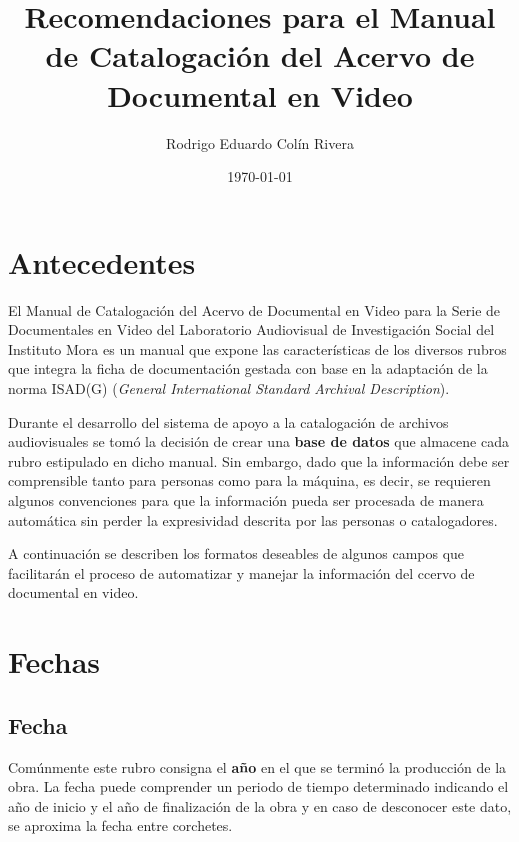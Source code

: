 \documentclass[10pt,letterpaper]{article}
\begin{document}
\title{Recomendaciones para el Manual de Catalogación del Acervo de Documental en Video}
\author{Rodrigo Eduardo Colín Rivera}
\date{\today}
\maketitle

\setcounter{secnumdepth}{0} %
\setcounter{tocdepth}{0} %

\section{Antecedentes}
El Manual de Catalogación del Acervo de Documental en Video para la Serie de Documentales en Video del Laboratorio Audiovisual de Investigación Social del Instituto Mora es un manual que expone las características de los diversos rubros que integra la ficha de documentación gestada con base en la adaptación de la norma ISAD(G) (\textit{General International Standard Archival Description}).

Durante el desarrollo del sistema de apoyo a la catalogación de archivos audiovisuales se tomó la decisión de crear una \textbf{base de datos} que almacene cada rubro estipulado en dicho manual. Sin embargo, dado que la información debe ser comprensible tanto para personas como para la máquina, es decir, se requieren algunos convenciones para que la información pueda ser procesada de manera automática sin perder la expresividad descrita por las personas o catalogadores.

A continuación se describen los formatos deseables de algunos campos que facilitarán el proceso de automatizar y manejar la información del ccervo de documental en video.

\section{Fechas}

\subsection{Fecha}
Comúnmente este rubro consigna el \textbf{año} en el que se terminó la producción de la obra. La fecha puede comprender un periodo de tiempo determinado indicando el año de inicio y el año de finalización de la obra y en caso de desconocer este dato, se aproxima la fecha entre corchetes. 
\end{document}
